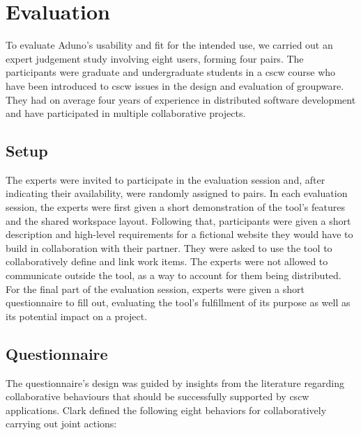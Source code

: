\documentclass[conference]{IEEEtran}
\begin{document}
\section{Evaluation}
\label{sec:evaluation}

To evaluate Aduno's usability and fit for the intended use, we carried out an expert judgement study involving eight users, forming four pairs. The participants were graduate and undergraduate students in a {\sc cscw} course who have been introduced to {\sc cscw} issues in the design and evaluation of groupware. They had on average four years of experience in distributed software development and have participated in multiple collaborative projects.

\subsection{Setup}
The experts were invited to participate in the evaluation session and, after indicating their availability, were randomly assigned to pairs. In each evaluation session, the experts were first given a short demonstration of the tool's features and the shared workspace layout. Following that, participants were given a short description and high-level requirements for a fictional website they would have to build in collaboration with their partner. They were asked to use the tool to collaboratively define and link work items. The experts were not allowed to communicate outside the tool, as a way to account for them being distributed. For the final part of the evaluation session, experts were given a short questionnaire to fill out, evaluating the tool's fulfillment of its purpose as well as its potential impact on a project.

\subsection{Questionnaire}
The questionnaire's design was guided by insights from the literature regarding collaborative behaviours that should be successfully supported by {\sc cscw} applications. Clark \cite{Clark96} defined the following eight behaviors for collaboratively carrying out joint actions:
\end{document}
